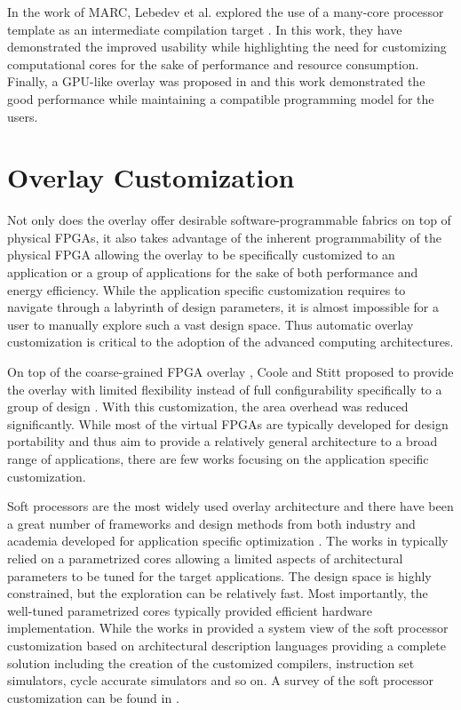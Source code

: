 In the work of MARC, Lebedev et al. explored the use of a many-core processor template as an intermediate compilation target \cite{lebedev2010MARC}. In this work, they have demonstrated the improved usability while highlighting the need for customizing computational cores for the sake of performance and resource consumption. Finally, a GPU-like overlay was proposed in \cite{jeffrey2011potential} and this work demonstrated the good performance while maintaining a compatible programming model for the users.

\section{Overlay Customization}
Not only does the overlay offer desirable software-programmable fabrics on top of physical FPGAs, it also takes advantage of the inherent programmability of the physical FPGA allowing the overlay to be specifically customized to an application or a group of applications for the sake of both performance and energy efficiency. While the application specific customization requires to navigate through a labyrinth of design parameters, it is almost impossible for a user to manually explore such a vast design space. Thus automatic overlay customization is critical to the adoption of the advanced computing architectures. 

On top of the coarse-grained FPGA overlay \cite{coole2010intermediate}, Coole and Stitt proposed to provide the overlay with limited flexibility instead of full configurability specifically to a group of design \cite{coole2015adjustable}. With this customization, the area overhead was reduced significantly. While most of the virtual FPGAs are typically developed for design portability and thus aim to provide a relatively general architecture to a broad range of applications, there are few works focusing on the application specific customization. 

Soft processors are the most widely used overlay architecture and there have been a great number of frameworks and design methods from both industry and academia developed for application specific optimization \cite{nios, microblaze,lodi2003pipelined, gries2004methods, leon, itoh2000peas, yiannacouras2005microarchitecture, dimond2005custard, chattopadhyay2006automatic}. The works in \cite{lodi2003pipelined, gries2004methods, nios, microblaze, leon} typically relied on a parametrized cores allowing a limited aspects of architectural parameters to be tuned for the target applications. The design space is highly constrained, but the exploration can be relatively fast. Most importantly, the well-tuned parametrized cores typically provided efficient hardware implementation. While the works in \cite{itoh2000peas, yiannacouras2005microarchitecture, dimond2005custard, chattopadhyay2006automatic} provided a system view of the soft processor customization based on architectural description languages providing a complete solution including the creation of the customized compilers, instruction set simulators, cycle accurate simulators and so on. A survey of the soft processor customization can be found in \cite{chattopadhyay2013ingredients, galuzzi2011instruction}. 


